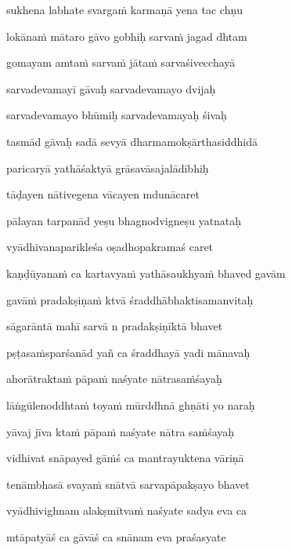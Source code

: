 sukhena labhate svargaṁ karmaṇā yena tac chṇu \veg\dontdisplaylinenum

lokānaṁ mātaro gāvo gobhiḥ sarvaṁ jagad dhtam\thinspace{\dandab} \dontdisplaylinenum

gomayam amtaṁ sarvaṁ jātaṁ sarvaśivecchayā \veg\dontdisplaylinenum

sarvadevamayī gāvaḥ sarvadevamayo dvijaḥ\thinspace{\dandab} \dontdisplaylinenum

sarvadevamayo bhūmiḥ sarvadevamayaḥ śivaḥ \veg\dontdisplaylinenum

tasmād gāvaḥ sadā sevyā dharmamokṣārthasiddhidā\thinspace{\dandab} \dontdisplaylinenum

paricaryā yathāśaktyā grāsavāsajalādibhiḥ \veg\dontdisplaylinenum

tāḍayen nātivegena vācayen mdunācaret\thinspace{\dandab} \dontdisplaylinenum

pālayan tarpanād yeṣu bhagnodvigneṣu yatnataḥ \veg\dontdisplaylinenum

vyādhivanaparikleśa oṣadhopakramaś caret\thinspace{\dandab} \dontdisplaylinenum

kaṇḍūyanaṁ ca kartavyaṁ yathāsaukhyaṁ bhaved gavām \veg\dontdisplaylinenum

gavāṁ pradakṣiṇaṁ ktvā śraddhābhaktisamanvitaḥ\thinspace{\dandab} \dontdisplaylinenum

sāgarāntā mahī sarvā n pradakṣiṇīktā bhavet \veg\dontdisplaylinenum

pṣṭasaṁsparśanād yañ ca śraddhayā yadi mānavaḥ\thinspace{\dandab} \dontdisplaylinenum

ahorātraktaṁ pāpaṁ naśyate nātrasaṁśayaḥ \veg\dontdisplaylinenum

lāṅgūlenoddhtaṁ toyaṁ mūrddhnā ghṇāti yo naraḥ\thinspace{\dandab} \dontdisplaylinenum

yāvaj jīva ktaṁ pāpaṁ naśyate nātra saṁśayaḥ \veg\dontdisplaylinenum

vidhivat snāpayed gāṁś ca mantrayuktena vāriṇā\thinspace{\dandab} \dontdisplaylinenum

tenāmbhasā svayaṁ snātvā sarvapāpakṣayo bhavet \veg\dontdisplaylinenum

vyādhivighnam alakṣmītvaṁ naśyate sadya eva ca\thinspace{\dandab} \dontdisplaylinenum

mtāpatyāś ca gāvāś ca snānam eva praśasyate \veg\dontdisplaylinenum


